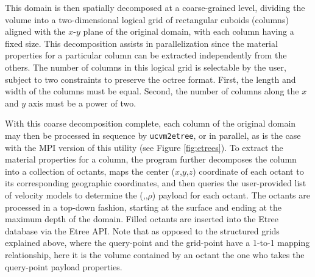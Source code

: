 
This domain is then spatially decomposed at a coarse-grained level, dividing the volume into a two-dimensional logical grid of rectangular cuboids (columns) aligned with the $x$-$y$ plane of the original domain, with each column having a fixed size. This decomposition assists in parallelization since the material properties for a particular column can be extracted independently from the others. The number of columns in this logical grid is selectable by the user, subject to two constraints to preserve the octree format. First, the length and width of the columns must be equal. Second, the number of columns along the $x$ and $y$ axis must be a power of two.

With this coarse decomposition complete, each column of the original domain may then be processed in sequence by \texttt{ucvm2etree}, or in parallel, as is the case with the MPI version of this utility (see Figure \ref{fig:etrees}). To extract the material properties for a column, the program further decomposes the column into a collection of octants, maps the center ($x$,$y$,$z$) coordinate of each octant to its corresponding geographic coordinates, and then queries the user-provided list of velocity models to determine the (\vp{},\vs{},$\rho$) payload for each octant. The octants are processed in a top-down fashion, starting at the surface and ending at the maximum depth of the domain. Filled octants are inserted into the Etree database via the Etree API. Note that as opposed to the structured grids explained above, where the query-point and the grid-point have a 1-to-1 mapping relationship, here it is the volume contained by an octant the one who takes the query-point payload properties.


